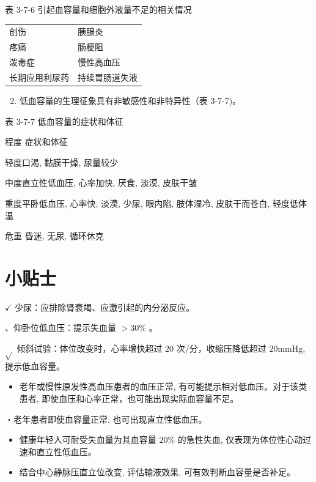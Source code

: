 \documentclass[10pt]{article}
\begin{document}
表 3-7-6 引起血容量和细胞外液量不足的相关情况

\begin{center}
\begin{tabular}{ll}
\hline
创伤 & 胰腺炎 \\
疼痛 & 肠梗阻 \\
泼毒症 & 慢性高血压 \\
长期应用利尿药 & 持续胃肠道失液 \\
\hline
\end{tabular}
\end{center}

\begin{enumerate}
  \setcounter{enumi}{1}
  \item 低血容量的生理征象具有非敏感性和非特异性（表 3-7-7)。
\end{enumerate}

表 3-7-7 低血容量的症状和体征

程度 症状和体征

轻度口渴, 黏膜干燥, 尿量较少

中度直立性低血压, 心率加快, 厌食, 淡漠, 皮肤干皱

重度平卧低血压, 心率快, 淡漠, 少尿, 眼内陷, 肢体湿冷, 皮肤干而苍白, 轻度低体温

危重 昏迷, 无尿, 循环休克

\section*{小贴士}
$\checkmark$ 少尿：应排除肾衰竭、应激引起的内分泌反应。

、仰卧位低血压：提示失血量 $>30 \%$ 。

$\sqrt{ }$ 倾斜试验：体位改变时，心率增快超过 20 次/分，收缩压降低超过 $20 \mathrm{mmHg}$, 提示低血容量。

\begin{itemize}
  \item 老年或慢性原发性高血压患者的血压正常, 有可能提示相对低血压。对于该类患者, 即使血压和心率正常，也可能出现实际血容量不足。
\end{itemize}

・老年患者即使血容量正常, 也可出现直立性低血压。

\begin{itemize}
  \item 健康年轻人可耐受失血量为其血容量 $20 \%$ 的急性失血, 仅表现为体位性心动过速和直立性低血压。
  \item 结合中心静脉压直立位改变, 评估输液效果, 可有效判断血容量是否补足。
\end{itemize}
\end{document}
